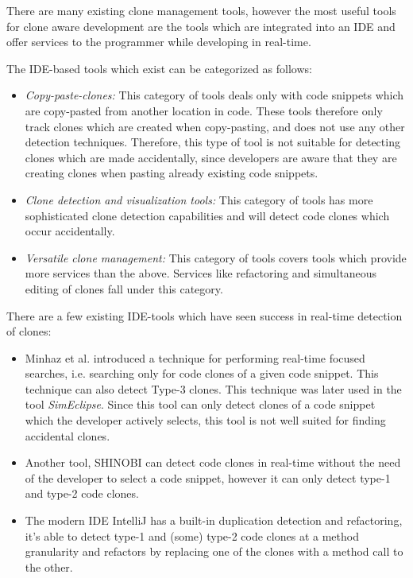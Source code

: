 \documentclass[12pt]{article}
\begin{document}
There are many existing clone management tools, however the most useful tools for clone
aware development are the tools which are integrated into an IDE and offer services to the
programmer while developing in real-time.

The IDE-based tools which exist can be categorized as
follows\cite[8]{Udding_Towards_Convenient_Management}:

\begin{itemize}
	\item\textit{Copy-paste-clones:} This category of tools deals only with code snippets which are
	copy-pasted from another location in code. These tools therefore only track clones which
	are created when copy-pasting, and does not use any other detection techniques. Therefore,
	this type of tool is not suitable for detecting clones which are made accidentally, since
	developers are aware that they are creating clones when pasting already existing code
	snippets.

	\item\textit{Clone detection and visualization tools:} This category of tools has more
	sophisticated clone detection capabilities and will detect code clones which occur
	accidentally.

	\item\textit{Versatile clone management:} This category of tools covers tools which provide more
	services than the above. Services like refactoring and simultaneous editing of clones fall
	under this category.
\end{itemize}

There are a few existing IDE-tools which have seen success in real-time detection of clones:

\begin{itemize}
	\item Minhaz et al. introduced a technique for performing real-time focused
	      searches, i.e. searching only for code clones of a given code snippet. This
	      technique can also detect Type-3 clones\cite{Zibran_real_time_search}.
	      This technique was later used in the tool
	      \textit{SimEclipse}\cite{Udding_Towards_Convenient_Management}. Since this tool
	      can only detect clones of a code snippet which the developer actively selects, this tool is
	      not well suited for finding accidental clones.

	\item Another tool, SHINOBI can detect code clones in real-time without the need
	      of the developer to select a code snippet, however it can only detect type-1
	      and type-2 code clones\cite{SHINOBI}.
	\item The modern IDE IntelliJ has a built-in duplication detection and
	      refactoring, it's able to detect type-1 and (some) type-2 code clones at a method
	      granularity and refactors by replacing one of the clones with a method call to
          the other.
\end{itemize}
\end{document}
